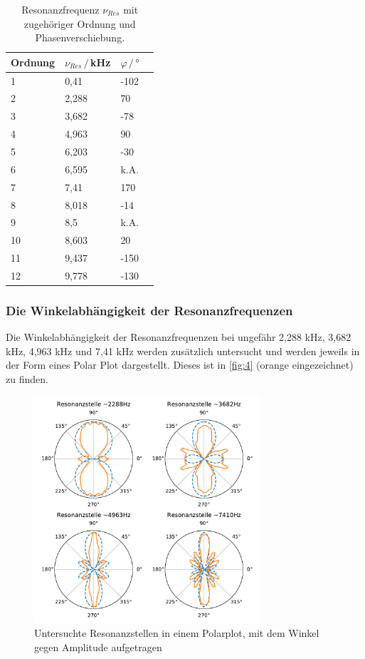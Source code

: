 \begin{table}[H]
    \center
    \caption{Resonanzfrequenz $\nu_{Res}$ mit zugehöriger Ordnung und Phasenverschiebung.}
    \label{tab:1}
    \begin{tabular}{l l l c}
        \toprule
        Ordnung & $\nu_{Res}\,/\,$kHz & $\varphi\,/\,°$\\
        \midrule
        1 &0,41   & -102  \\
        2 &2,288 &   70  \\
        3 &3,682 &  -78  \\
        4 &4,963 &   90  \\
        5 &6,203 &  -30  \\
        6 &6,595 &  k.A. \\
        7 &7,41 &  170  \\
        8 &8,018 &  -14  \\
        9 & 8,5 & k.A. \\
        10 &8,603 &   20  \\
        11 &9,437 & -150  \\
        12 &9,778 & -130  \\
        \bottomrule
    \end{tabular}
\end{table}

\subsubsection{Die Winkelabhängigkeit der Resonanzfrequenzen}

Die Winkelabhängigkeit der Resonanzfrequenzen bei ungefähr 2,288 kHz, 3,682 kHz, 4,963 kHz und 7,41 kHz werden zusätzlich untersucht und werden jeweils in der Form eines Polar Plot
dargestellt. Dieses ist in \autoref{fig:4} (orange eingezeichnet) zu finden.

\begin{figure}
    \centering
    \includegraphics[width=0.75\textwidth]{pic/all.pdf}
    \caption{Untersuchte Resonanzstellen in einem Polarplot, mit dem Winkel gegen Amplitude aufgetragen}
    \label{fig:4}
  \end{figure}

